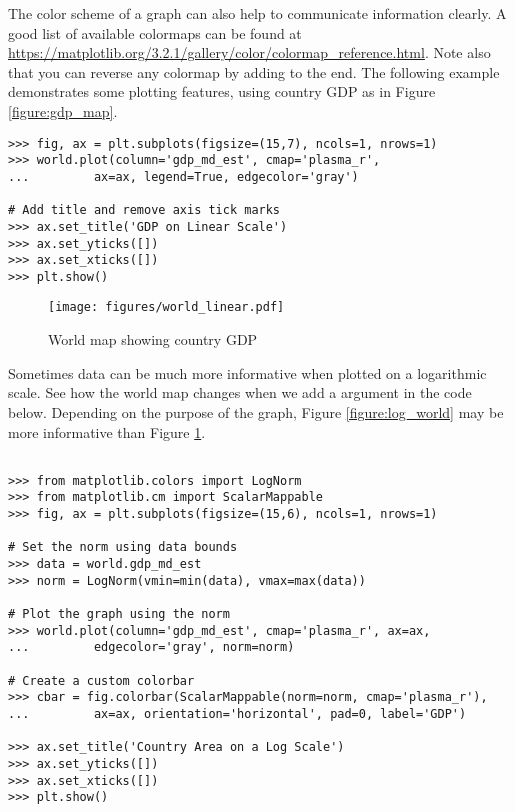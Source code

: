 The color scheme of a graph can also help to communicate information clearly.
A good list of available colormaps can be found at \url{https://matplotlib.org/3.2.1/gallery/color/colormap_reference.html}.
Note also that you can reverse any colormap by adding  to the end.
The following example demonstrates some plotting features, using country GDP as in Figure \ref{figure:gdp_map}.

\begin{lstlisting}
>>> fig, ax = plt.subplots(figsize=(15,7), ncols=1, nrows=1)
>>> world.plot(column='gdp_md_est', cmap='plasma_r',
...			ax=ax, legend=True, edgecolor='gray')

# Add title and remove axis tick marks
>>> ax.set_title('GDP on Linear Scale')
>>> ax.set_yticks([])
>>> ax.set_xticks([])
>>> plt.show()
\end{lstlisting}

\begin{figure}[H]
\begin{center}
\texttt{[image: figures/world\_linear.pdf]}
\end{center}
\caption{World map showing country GDP}
\label{figure:linear_world}
\end{figure}

Sometimes data can be much more informative when plotted on a logarithmic scale.
See how the world map changes when we add a  argument in the code below.
Depending on the purpose of the graph, Figure \ref{figure:log_world} may be more informative than Figure \ref{figure:linear_world}.

\begin{lstlisting}

>>> from matplotlib.colors import LogNorm
>>> from matplotlib.cm import ScalarMappable
>>> fig, ax = plt.subplots(figsize=(15,6), ncols=1, nrows=1)

# Set the norm using data bounds
>>> data = world.gdp_md_est
>>> norm = LogNorm(vmin=min(data), vmax=max(data))

# Plot the graph using the norm
>>> world.plot(column='gdp_md_est', cmap='plasma_r', ax=ax,
...			edgecolor='gray', norm=norm)

# Create a custom colorbar
>>> cbar = fig.colorbar(ScalarMappable(norm=norm, cmap='plasma_r'),
...			ax=ax, orientation='horizontal', pad=0, label='GDP')

>>> ax.set_title('Country Area on a Log Scale')
>>> ax.set_yticks([])
>>> ax.set_xticks([])
>>> plt.show()
\end{lstlisting}

